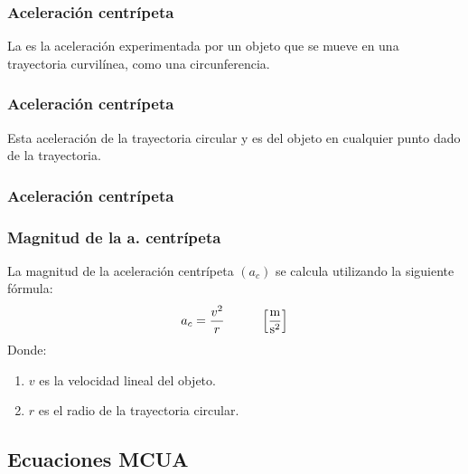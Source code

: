 \documentclass[14pt]{beamer}
\begin{document}
\begin{frame}
\frametitle{Aceleración centrípeta}
La  es la aceleración experimentada por un objeto que se mueve en una trayectoria curvilínea, como una circunferencia.
\end{frame}
\begin{frame}
\frametitle{Aceleración centrípeta}
Esta aceleración  de la trayectoria circular \pause y es  del objeto en cualquier punto dado de la trayectoria.
\end{frame}
\begin{frame}
\frametitle{Aceleración centrípeta}
\vspace*{-1cm}
\begin{figure}
\end{figure}
\end{frame}
\begin{frame}
\frametitle{Magnitud de la a. centrípeta}
La magnitud de la aceleración centrípeta $(a_{c})$ se calcula utilizando la siguiente fórmula:
\begin{align*}
a_{c} = \dfrac{v^{2}}{r} \hspace{1cm} \left[ \unit[per-mode=fraction]{\meter\per\square\second} \right]
\end{align*}
\pause
Donde:
\begin{enumerate}[<+->]
\item $v$ es la velocidad lineal del objeto.
\item $r$ es el radio de la trayectoria circular.
\end{enumerate}
\end{frame}

\subsection{Ecuaciones MCUA}
\end{document}
